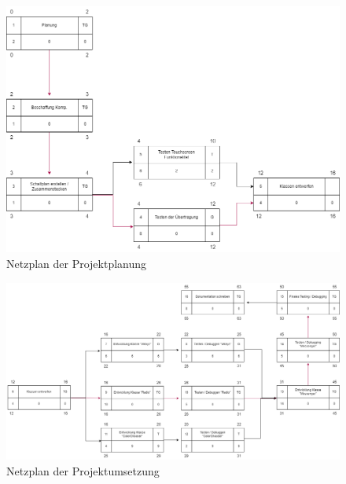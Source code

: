 \documentclass[a4paper, 11pt]{scrartcl}
\begin{document}
\begin{small}
\begin{figure}[H]
    \begin{center}
        \includegraphics[scale=0.4]{Bilder/netzplan_planung.png}
        \caption{Netzplan der Projektplanung}\label{diag:netzplan_planung}
    \end{center}
\end{figure}

\begin{figure}[H]
    \begin{center}
        \includegraphics[scale=0.35]{Bilder/netzplan_umsetzung.png}
        \caption{Netzplan der Projektumsetzung}\label{diag:netzplan_umsetzung}
    \end{center}
\end{figure}


\end{small}
\end{document}
